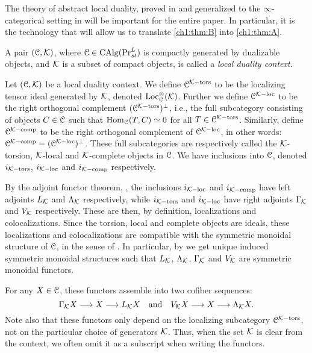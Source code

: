 The theory of abstract local duality, proved in \cite{hovey-palmiery-strickland_97} and generalized to the $\infty$-categorical setting in \cite{barthel-heard-valenzuela_2018} will be important for the entire paper. In particular, it is the technology that will allow us to translate \cref{ch1:thm:B} into \cref{ch1:thm:A}. 

\begin{definition}
    \label{ch1:def:local-duality-context}
    A pair $(\EuScript{C}, \mathcal{K})$, where $\EuScript{C}\in \operatorname{CAlg}(\mathrm{Pr}_{st}^L)$ is compactly generated by dualizable objects, and $\mathcal{K}$ is a subset of compact objects, is called a \emph{local duality context}.
\end{definition}

\begin{construction}
    Let $(\EuScript{C}, \mathcal{K})$ be a local duality context. We define $\EuScript{C}^{\mathcal{K}-\mathrm{tors}}$ to be the localizing tensor ideal generated by $\mathcal{K}$, denoted $\operatorname{Loc}^\otimes_{\EuScript{C}}(\mathcal{K})$. Further we define $\EuScript{C}^{\mathcal{K}-\mathrm{loc}}$ to be the right orthogonal complement $(\EuScript{C}^{\mathcal{K}-\mathrm{tors}})^\perp$, i.e., the full subcategory consisting of objects $C\in \EuScript{C}$ such that $\operatorname{Hom}_{\EuScript{C}}(T,C)\simeq 0$ for all $T\in \EuScript{C}^{\mathcal{K}-\mathrm{tors}}$. Similarly, define $\EuScript{C}^{\mathcal{K}-\mathrm{comp}}$ to be the right orthogonal complement of $\EuScript{C}^{\mathcal{K}-\mathrm{loc}}$, in other words: $\EuScript{C}^{\mathcal{K}-\mathrm{comp}}= (\EuScript{C}^{\mathcal{K}-\mathrm{loc}})^\perp$. These full subcategories are respectively called the $\mathcal{K}$-torsion, $\mathcal{K}$-local and $\mathcal{K}$-complete objects in $\EuScript{C}$. We have inclusions into $\EuScript{C}$, denoted $i_{\mathcal{K}-\mathrm{tors}}$, $i_{\mathcal{K}-\mathrm{loc}}$ and $i_{\mathcal{K}-\mathrm{comp}}$ respectively. 
    
    By the adjoint functor theorem, \cite[5.5.2.9]{lurie_09}, the inclusions $i_{\mathcal{K}-\mathrm{loc}}$ and $i_{\mathcal{K}-\mathrm{comp}}$ have left adjoints $L_{\mathcal{K}}$ and $\Lambda_{\mathcal{K}}$ respectively, while $i_{\mathcal{K}-\mathrm{tors}}$ and $i_{\mathcal{K}-\mathrm{loc}}$ have right adjoints $\Gamma_{\mathcal{K}}$ and $V_{\mathcal{K}}$ respectively. These are then, by definition, localizations and colocalizations. Since the torsion, local and complete objects are ideals, these localizations and colocalizations are compatible with the symmetric monoidal structure of $\EuScript{C}$, in the sense of \cite[2.2.1.7]{Lurie_HA}. In particular, by \cite[2.2.1.9]{Lurie_HA} we get unique induced symmetric monoidal structures such that $L_{\mathcal{K}}$, $\Lambda_{\mathcal{K}}$, $\Gamma_{\mathcal{K}}$ and $V_{\mathcal{K}}$ are symmetric monoidal functors. 

    For any $X\in \EuScript{C}$, these functors assemble into two cofiber sequences:
    $$\Gamma_{\mathcal{K}} X \longrightarrow X \longrightarrow L_{\mathcal{K}} X \quad \text{and}\quad V_{\mathcal{K}} X \longrightarrow X \longrightarrow \Lambda_{\mathcal{K}} X.$$
    Note also that these functors only depend on the localizing subcategory $\EuScript{C}^{\mathcal{K}-\mathrm{tors}}$, not on the particular choice of generators $\mathcal{K}$. Thus, when the set $\mathcal{K}$ is clear from the context, we often omit it as a subscript when writing the functors. 
\end{construction}

